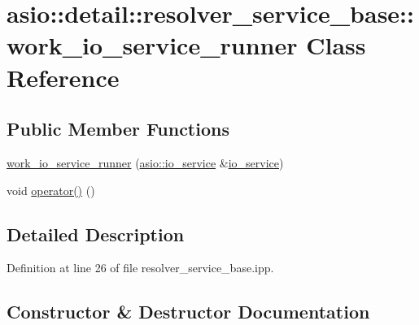 \hypertarget{classasio_1_1detail_1_1resolver__service__base_1_1work__io__service__runner}{}\section{asio\+:\+:detail\+:\+:resolver\+\_\+service\+\_\+base\+:\+:work\+\_\+io\+\_\+service\+\_\+runner Class Reference}
\label{classasio_1_1detail_1_1resolver__service__base_1_1work__io__service__runner}
\subsection*{Public Member Functions}
\begin{DoxyCompactItemize}
\item 
\hyperlink{classasio_1_1detail_1_1resolver__service__base_1_1work__io__service__runner_acf4e358180b4eee48056f7e94112b38e}{work\+\_\+io\+\_\+service\+\_\+runner} (\hyperlink{classasio_1_1io__service}{asio\+::io\+\_\+service} \&\hyperlink{classasio_1_1io__service}{io\+\_\+service})
\item 
void \hyperlink{classasio_1_1detail_1_1resolver__service__base_1_1work__io__service__runner_a787a00573a4f50831c0f547e9be16101}{operator()} ()
\end{DoxyCompactItemize}


\subsection{Detailed Description}


Definition at line 26 of file resolver\+\_\+service\+\_\+base.\+ipp.



\subsection{Constructor \& Destructor Documentation}
\hypertarget{classasio_1_1detail_1_1resolver__service__base_1_1work__io__service__runner_acf4e358180b4eee48056f7e94112b38e}{}
